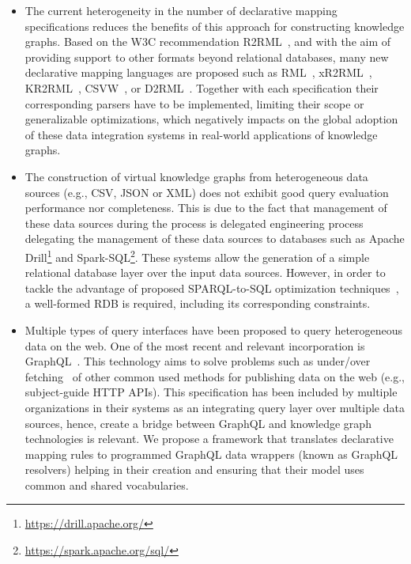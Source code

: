 \begin{itemize}
    \item The current heterogeneity in the number of declarative mapping specifications reduces the benefits of this approach for constructing knowledge graphs. Based on the W3C recommendation R2RML~\citep{R2RML}, and with the aim of providing support to other formats beyond relational databases, many new declarative mapping languages are proposed such as RML~\citep{dimou2014rml}, xR2RML~\citep{michel2015translation}, KR2RML~\citep{slepicka2015kr2rml}, CSVW~\citep{tennison2015model}, or D2RML~\citep{chortaras2018mapping}. Together with each specification their corresponding parsers have to be implemented, limiting their scope or generalizable optimizations, which negatively impacts on the global adoption of these data integration systems in real-world applications of knowledge graphs.

    \item The construction of virtual knowledge graphs from heterogeneous data sources (e.g., CSV, JSON or XML) does not exhibit good query evaluation performance nor completeness. This is due to the fact that management of these data sources during the process is delegated  engineering process delegating the management of these data sources to databases such as Apache Drill\footnote{\url{https://drill.apache.org/}} and Spark-SQL\footnote{\url{https://spark.apache.org/sql/}}. These systems allow the generation of a simple relational database layer over the input data sources. However, in order to tackle the advantage of proposed SPARQL-to-SQL optimization techniques~\citep{priyatna2014formalisation,calvanese2017ontop}, a well-formed RDB is required, including its corresponding constraints. 
   
    \item Multiple types of query interfaces have been proposed to query heterogeneous data on the web. One of the most recent and relevant incorporation is GraphQL~\citep{graphql}. This technology aims to solve problems such as under/over fetching~\citep{bryant2017graphql,vogel2017experiences,mukhiya2019graphql} of other common used methods for publishing data on the web (e.g., subject-guide HTTP APIs). This specification has been included by multiple organizations in their systems as an integrating query layer over multiple data sources, hence, create a bridge between GraphQL and knowledge graph technologies is relevant. We propose a framework that translates declarative mapping rules to programmed GraphQL data wrappers (known as GraphQL resolvers) helping in their creation and ensuring that their model uses common and shared vocabularies.
    

\end{itemize}
